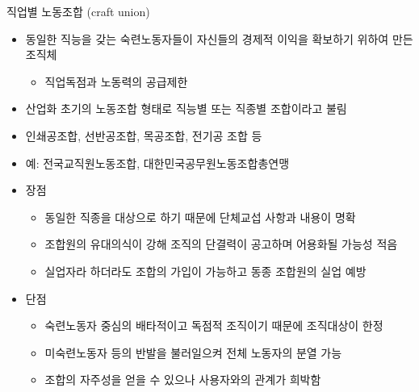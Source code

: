 \documentclass[aspectratio=169,xcolor=dvipsnames,handout]{beamer}
\begin{document}
\begin{frame}[allowframebreaks]{직업별 노동조합 (craft union)}
    \begin{itemize}[<+->]
        \item 동일한 직능을 갖는 숙련노동자들이 자신들의 경제적 이익을 확보하기 위하여 만든 조직체
        \begin{itemize}[<+->]
            \item 직업독점과 노동력의 공급제한
        \end{itemize}
        \item 산업화 초기의 노동조합 형태로 직능별 또는 직종별 조합이라고 불림
        \item 인쇄공조합, 선반공조합, 목공조합, 전기공 조합 등
        \item 예: 전국교직원노동조합, 대한민국공무원노동조합총연맹
        \framebreak\relax
        \item 장점
        \begin{itemize}[<+->]
            \item 동일한 직종을 대상으로 하기 때문에 단체교섭 사항과 내용이 명확  
            \item 조합원의 유대의식이 강해 조직의 단결력이 공고하며 어용화될 가능성 적음
            \item 실업자라 하더라도 조합의 가입이 가능하고 동종 조합원의 실업 예방
        \end{itemize}
        \item 단점
        \begin{itemize}[<+->]
            \item 숙련노동자 중심의 배타적이고 독점적 조직이기 때문에 조직대상이 한정 
            \item 미숙련노동자 등의 반발을 불러일으켜 전체 노동자의 분열 가능
            \item 조합의 자주성을 얻을 수 있으나 사용자와의 관계가 희박함
        \end{itemize}
    \end{itemize}
\end{frame}
\end{document}
